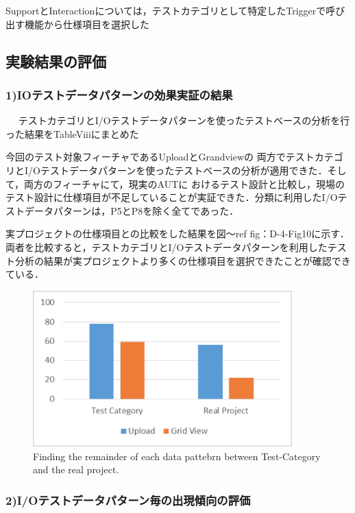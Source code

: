 \documentclass[a4paper,12pt]{jreport}
\begin{document}
SupportとInteractionについては，テストカテゴリとして特定したTriggerで呼び出す機能から仕様項目を選択した

\subsection{実験結果の評価}

\subsubsection{1)IOテストデータパターンの効果実証の結果}
　
テストカテゴリとI/Oテストデータパターンを使ったテストベースの分析を行った結果をTableViiiにまとめた

今回のテスト対象フィーチャであるUploadとGrandviewの 両方でテストカテゴリとI/Oテストデータパターンを使ったテストベースの分析が適用できた．そして，両方のフィーチャにて，現実のAUTに おけるテスト設計と比較し，現場のテスト設計に仕様項目が不足していることが実証できた．分類に利用したI/Oテストデータパターンは，P5とP8を除く全てであった．



実プロジェクトの仕様項目との比較をした結果を図〜ref {fig：D-4-Fig10}に示す．両者を比較すると，テストカテゴリとI/Oテストデータパターンを利用したテスト分析の結果が実プロジェクトより多くの仕様項目を選択できたことが確認できている．
   \begin{figure}[htbp]
  \begin{center}
  \includegraphics[width=10cm]{./image/D-4-Fig10.png}
  \caption{Finding the remainder of each data pattebrn between Test-Category and the real project.}
  \label{fig:D-4-Fig10}
  \end{center}
   \end{figure}

\subsubsection{2)I/Oテストデータパターン毎の出現傾向の評価}
\end{document}
